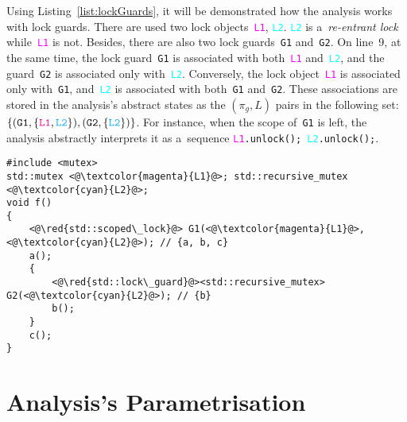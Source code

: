 \begin{example}
    Using Listing~\ref{list:lockGuards}, it will be demonstrated how the analysis works with lock guards. There are used two lock objects~\textcolor{magenta}{\texttt{L1}}, \textcolor{cyan}{\texttt{L2}}. \textcolor{cyan}{\texttt{L2}} is a~\emph{re-entrant lock} while~\textcolor{magenta}{\texttt{L1}} is not. Besides, there are also two lock guards~\texttt{G1} and~\texttt{G2}. On line~9, at the same time, the lock guard~\texttt{G1} is associated with both~\textcolor{magenta}{\texttt{L1}} and~\textcolor{cyan}{\texttt{L2}}, and the guard~\texttt{G2} is associated only with~\textcolor{cyan}{\texttt{L2}}. Conversely, the lock object~\textcolor{magenta}{\texttt{L1}} is associated only with~\texttt{G1}, and~\textcolor{cyan}{\texttt{L2}} is associated with both~\texttt{G1} and~\texttt{G2}. These associations are stored in the analysis's abstract states as the $ (\pi_g, L) $ pairs in the following set: $ \{(\mathtt{G1}, \{\textcolor{magenta}{\mathtt{L1}}, \textcolor{cyan}{\mathtt{L2}}\}), (\mathtt{G2}, \{\textcolor{cyan}{\mathtt{L2}}\})\} $. For instance, when the scope of~\texttt{G1} is left, the analysis abstractly interprets it as a~sequence \texttt{\textcolor{magenta}{L1}.unlock(); \textcolor{cyan}{L2}.unlock();}.
\end{example}
    
\begin{lstlisting}[style=c++, label={list:lockGuards}, float=hbt, caption={An example of \emph{lock guards} in C++. The entire function~\texttt{f} is locked with lock objects~\textcolor{magenta}{\texttt{L1}}, \textcolor{cyan}{\texttt{L2}} using \texttt{std::scoped\_lock}, which is a~type of lock guard that can lock multiple lock objects at once (note that \texttt{std::scoped\_lock} is available since C++~17). However, there is also an inner atomic section locked with~\textcolor{cyan}{\texttt{L2}} using \texttt{std::lock\_guard}. \textcolor{cyan}{\texttt{L2}} is, in effect, locked twice\,---\,it is a~\emph{re-entrant lock} of a~type \texttt{std::recursive\_mutex}}]
#include <mutex>
std::mutex <@\textcolor{magenta}{L1}@>; std::recursive_mutex <@\textcolor{cyan}{L2}@>;
void f()
{
    <@\red{std::scoped\_lock}@> G1(<@\textcolor{magenta}{L1}@>, <@\textcolor{cyan}{L2}@>); // {a, b, c}
    a();
    {
        <@\red{std::lock\_guard}@><std::recursive_mutex> G2(<@\textcolor{cyan}{L2}@>); // {b}
        b();
    }
    c();
}
\end{lstlisting}


\section{Analysis's Parametrisation}
\label{sec:proposalParametr}

